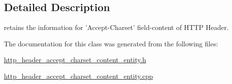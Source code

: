 \subsection{Detailed Description}
retains the information for 'Accept-\/\-Charset' field-\/content of H\-T\-T\-P Header. 

The documentation for this class was generated from the following files\-:\begin{DoxyCompactItemize}
\item 
\hyperlink{http__header__accept__charset__content__entity_8h}{http\-\_\-header\-\_\-accept\-\_\-charset\-\_\-content\-\_\-entity.\-h}\item 
\hyperlink{http__header__accept__charset__content__entity_8cpp}{http\-\_\-header\-\_\-accept\-\_\-charset\-\_\-content\-\_\-entity.\-cpp}\end{DoxyCompactItemize}
